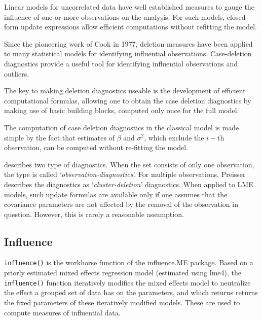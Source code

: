 \documentclass[Main.tex]{subfiles}
\begin{document}
	Linear models for uncorrelated data have well established measures to gauge the influence of one or more
	observations on the analysis. For such models, closed-form update expressions allow efficient computations
	without refitting the model. 
	
	
	Since the pioneering work of Cook in 1977, deletion measures have been applied to many statistical models for identifying influential observations. Case-deletion diagnostics provide a useful tool for identifying influential observations and outliers.
	
	The key to making deletion diagnostics useable is the development of efficient computational formulas, allowing one to obtain the  case deletion diagnostics by making use of basic building blocks, computed only once for the full model.
	
	The computation of case deletion diagnostics in the classical model is made simple by the fact that estimates of $\beta$ and $\sigma^2$, which exclude the $i-$th observation, can be computed without re-fitting the model. %
	
	\citet{preisser} describes two type of diagnostics. When the set consists of only one observation, the type is called
	`\textit{observation-diagnostics}'. For multiple observations, Preisser describes the diagnostics as `\textit{cluster-deletion}' diagnostics. When applied to LME models, such update formulas are available only if one assumes that the covariance parameters are not affected by the removal of the observation in question. However, this is rarely a reasonable assumption.
	
	\subsection{Influence}
	\texttt{influence()} is the workhorse function of the influence.ME package. Based on a priorly estimated mixed effects regression model (estimated using lme4), the \texttt{influence()} function iteratively modifies the mixed effects model to neutralize the effect a grouped set of data has on the parameters, and which returns returns the fixed parameters of these iteratively modified models. These are used to compute measures of influential data.
\end{document}
